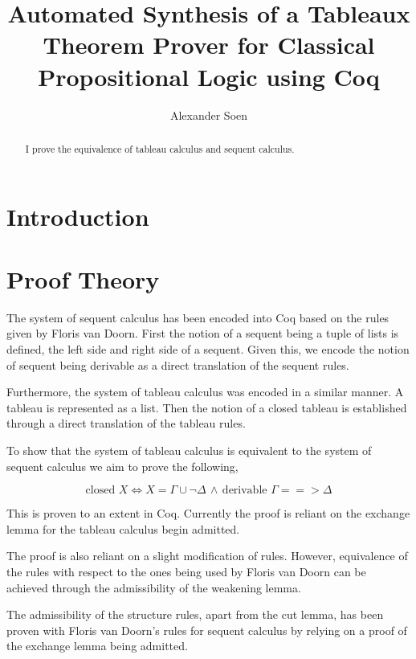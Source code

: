 \documentclass{report}
\title{ Automated Synthesis of a Tableaux Theorem Prover for Classical
Propositional Logic using Coq}
\author{Alexander Soen}
\begin{document}
\begin{abstract}
I prove the equivalence of tableau calculus and sequent calculus.
\end{abstract}

\section{Introduction}

\section{Proof Theory}

The system of sequent calculus has been encoded into Coq based on the rules
given by Floris van Doorn. First the notion of a sequent being a tuple of lists
is defined, the left side and right side of a sequent. Given this, we encode
the notion of sequent being derivable as a direct translation of the sequent
rules.

\par

Furthermore, the system of tableau calculus was encoded in a similar manner.
A tableau is represented as a list. Then the notion of a closed tableau is
established through a direct translation of the tableau rules.

\par

To show that the system of tableau calculus is equivalent to the system of
sequent calculus we aim to prove the following,

\begin{equation}
\text{closed }X \iff X=\Gamma \cup \neg \Delta \, \wedge \, \text{derivable }
\Gamma ==> \Delta
\label{tableau sequent equivalence}
\end{equation}

This is proven to an extent in Coq. Currently the proof is reliant on the
exchange lemma for the tableau calculus begin admitted.

\par

The proof is also reliant on a slight modification of rules. However,
equivalence of the rules with respect to the ones being used by Floris van
Doorn can be achieved through the admissibility of the weakening lemma.

\par

The admissibility of the structure rules, apart from the cut lemma, has been
proven with Floris van Doorn's rules for sequent calculus by relying on a
proof of the exchange lemma being admitted.
\end{document}
